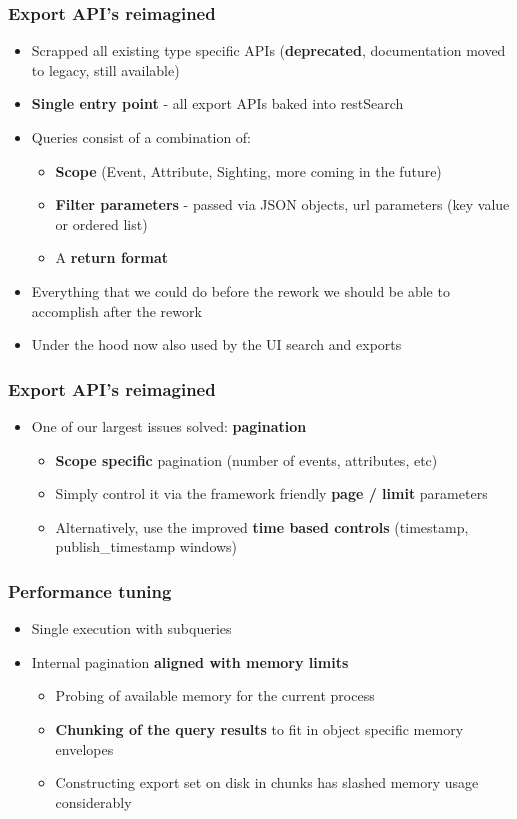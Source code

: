 \begin{frame}
\frametitle{Export API's reimagined}
    \begin{itemize}
        \item Scrapped all existing type specific APIs ({\bf deprecated}, documentation moved to legacy, still available)
	\item {\bf Single entry point} - all export APIs baked into restSearch
	\item Queries consist of a combination of:
	\begin{itemize}
		\item {\bf Scope} (Event, Attribute, Sighting, more coming in the future)
		\item {\bf Filter parameters} - passed via JSON objects, url parameters (key value or ordered list)
		\item A {\bf return format}
	\end{itemize}
	\item Everything that we could do before the rework we should be able to accomplish after the rework
	\item Under the hood now also used by the UI search and exports
    \end{itemize}
\end{frame}

\begin{frame}
\frametitle{Export API's reimagined}
    \begin{itemize}
	\item One of our largest issues solved: {\bf pagination}
	\begin{itemize}
		\item {\bf Scope specific} pagination (number of events, attributes, etc)
		\item Simply control it via the framework friendly {\bf page / limit} parameters
		\item Alternatively, use the improved {\bf time based controls} (timestamp, publish\_timestamp windows)
	\end{itemize}
    \end{itemize}
\end{frame}

\begin{frame}
\frametitle{Performance tuning}
    \begin{itemize}
	\item Single execution with subqueries
	\item Internal pagination {\bf aligned with memory limits}
	\begin{itemize}
		\item Probing of available memory for the current process
		\item {\bf Chunking of the query results} to fit in object specific memory envelopes
		\item Constructing export set on disk in chunks has slashed memory usage considerably
	\end{itemize}
    \end{itemize}
\end{frame}

